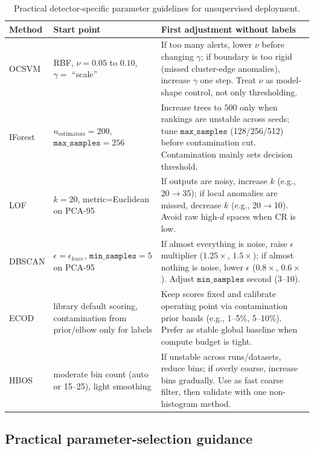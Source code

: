\documentclass[cameraready]{Interspeech}
\begin{document}
\begin{table}[!ht]
\centering
\caption{Practical detector-specific parameter guidelines for unsupervised deployment.}
\label{tab:practical-guidelines}
\small
\begin{tabularx}{\columnwidth}{p{1cm} p{1.5cm} X}
\toprule
\textbf{Method} & \textbf{Start point} & \textbf{First adjustment without labels} \\
\midrule
OCSVM & RBF, \(\nu=0.05\) to \(0.10\), \(\gamma=\) ``scale'' & If too many alerts, lower \(\nu\) before changing \(\gamma\); if boundary is too rigid (missed cluster-edge anomalies), increase \(\gamma\) one step. Treat \(\nu\) as model-shape control, not only thresholding. \\
IForest & \(n_{\text{estimators}}=200\), \(\texttt{max\_samples}=256\) & Increase trees to \(500\) only when rankings are unstable across seeds; tune \(\texttt{max\_samples}\) (128/256/512) before contamination cut. Contamination mainly sets decision threshold. \\
LOF & \(k=20\), metric=Euclidean on PCA-95 & If outputs are noisy, increase \(k\) (e.g., 20\(\rightarrow\)35); if local anomalies are missed, decrease \(k\) (e.g., 20\(\rightarrow\)10). Avoid raw high-\(d\) spaces when CR is low. \\
DBSCAN & \(\epsilon=\epsilon_{knee}\), \(\texttt{min\_samples}=5\) on PCA-95 & If almost everything is noise, raise \(\epsilon\) multiplier (\(1.25\times\), \(1.5\times\)); if almost nothing is noise, lower \(\epsilon\) (\(0.8\times\), \(0.6\times\)). Adjust \(\texttt{min\_samples}\) second (3--10). \\
ECOD & library default scoring, contamination from prior/elbow only for labels & Keep scores fixed and calibrate operating point via contamination prior bands (e.g., 1--5\%, 5--10\%). Prefer as stable global baseline when compute budget is tight. \\
HBOS & moderate bin count (auto or 15--25), light smoothing & If unstable across runs/datasets, reduce bins; if overly coarse, increase bins gradually. Use as fast coarse filter, then validate with one non-histogram method. \\
\bottomrule
\end{tabularx}
\end{table}

\subsection{Practical parameter-selection guidance}
\end{document}
